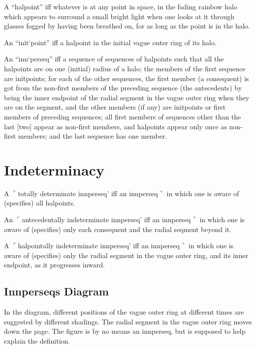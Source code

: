 \begin{sysrules}
A \enquote{halpoint} iff whatever is at any point in space, in the fading rainbow halo 
which appears to surround a small bright light when one looks at it through 
glasses fogged by having been breathed on, for as long as the point is in the 
halo. 

An \enquote{init`point} iff a halpoint in the initial vague outer ring of its halo. 


An \enquote{inn`perseq} iff a sequence of sequences of halpoints such that all the 
halpoints are on one (initial) radius of a halo; the members of the first 
sequence are initpoints; for each of the other sequences, the first member (a 
consequent) is got from the non-first members of the preceding sequence 
(the antecedents) by being the inner endpoint of the radial segment in the 
vague outer ring when they are on the segment, and the other members (if 
any) are initpoints or first members of preceding sequences; all first members 
of sequences other than the last [two] appear as non-first members, and 
halpoints appear only once as non-first members; and the last sequence has 
one member. 
\end{sysrules}

\section*{Indeterminacy}

\begin{sysrules}
A $\ulcorner$totally determinate innperseq' iff an innperseq$\urcorner$ in which one is aware of 
(specifies) all halpoints. 

An $\ulcorner$antecedentally indeterminate innperseq' iff an innperseq$\urcorner$ in which one is 
aware of (specifies) only each consequent and the radial seqment beyond it. 

A $\ulcorner$halpointally indeterminate innperseq' iff an innperseq$\urcorner$ in which one is 
aware of (specifies) only the radial segment in the vague outer ring, and its 
inner endpoint, as it progresses inward. 
\end{sysrules}

\subsection*{Innperseqs Diagram}

In the diagram, different positions of the vague outer ring at different times 
are suggested by different shadings. The radial segment in the vague outer 
ring moves down the page. The figure is by no means an innperseq, but is 
supposed to help explain the definition. 


